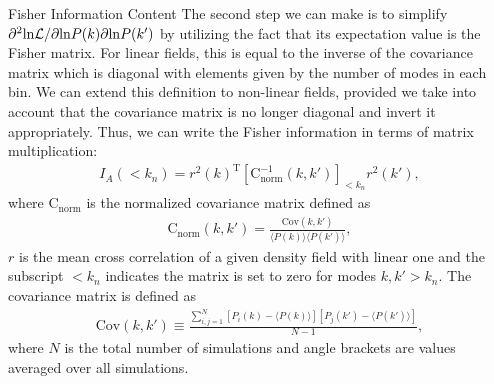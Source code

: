 \begin{section}{Fisher Information Content}
  The second step we can make is to simplify
  $\partial ^2 \mathrm{ln \mathcal{L}}/\partial \mathrm{ln} P(k) \partial
  \mathrm{ln} P(k')$
  by utilizing the fact that its expectation value is the Fisher
  matrix.  For linear fields, this is equal to the inverse of the
  covariance matrix which is diagonal with elements given by the
  number of modes in each bin.  We can extend this definition to
  non-linear fields, provided we take into account that the covariance
  matrix is no longer diagonal and invert it appropriately.  Thus, we
  can write the Fisher information in terms of matrix multiplication:
  \begin{align}
    I_A \left( < k_n\right) = r^2(k)^{\mathrm{T}} \left[ \mathrm{C^{-1}_{norm}} 
    ( k,k' )\right]_{<k_n} r^2(k') ,
    \label{eq:fisherformulaused}
  \end{align}
  where $\mathrm{C_{norm}}$ is the normalized covariance matrix
  defined as
  \begin{align}
    \mathrm{C_{norm}} \left( k,k' \right)=\frac{\mathrm{Cov}(k,k')}
    {\langle P(k)\rangle\langle P(k')\rangle},
  \end{align}
  $r$ is the mean cross correlation of a given density field with
  linear one and the subscript $<k_n$ indicates the matrix is set to
  zero for modes $k,k'>k_n$.  The covariance matrix is defined as
  \begin{align}
    \mathrm{Cov}\left(k,k'\right)\equiv \frac{\sum_{i,j=1}^{N}\left[ P_i \left( k \right) - 
    \langle P \left( k \right) \rangle \right]\left[ P_j \left( k' \right) - 
    \langle P \left( k' \right)\rangle \right]}{N-1},
  \end{align}
  where $N$ is the total number of simulations and angle brackets are
  values averaged over all simulations.  


\end{section}
